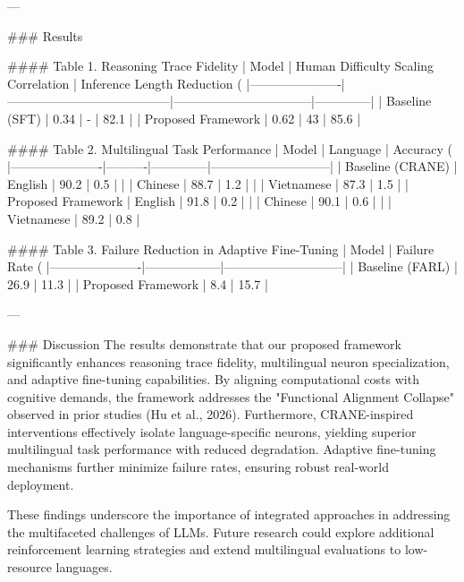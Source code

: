 ---

### Results

#### Table 1. Reasoning Trace Fidelity
| Model                | Human Difficulty Scaling Correlation | Inference Length Reduction (%
|----------------------|---------------------------------------|---------------------------------|--------------|
| Baseline (SFT)       | 0.34                                | -                              | 82.1         |
| Proposed Framework   | 0.62                                | 43                              | 85.6         |

#### Table 2. Multilingual Task Performance
| Model                | Language | Accuracy (%
|----------------------|----------|--------------|-----------------------------|
| Baseline (CRANE)     | English  | 90.2         | 0.5                         |
|                      | Chinese  | 88.7         | 1.2                         |
|                      | Vietnamese | 87.3       | 1.5                         |
| Proposed Framework   | English  | 91.8         | 0.2                         |
|                      | Chinese  | 90.1         | 0.6                         |
|                      | Vietnamese | 89.2       | 0.8                         |

#### Table 3. Failure Reduction in Adaptive Fine-Tuning
| Model                | Failure Rate (%
|----------------------|------------------|-----------------------------|
| Baseline (FARL)      | 26.9             | 11.3                        |
| Proposed Framework   | 8.4              | 15.7                        |

---

### Discussion
The results demonstrate that our proposed framework significantly enhances reasoning trace fidelity, multilingual neuron specialization, and adaptive fine-tuning capabilities. By aligning computational costs with cognitive demands, the framework addresses the "Functional Alignment Collapse" observed in prior studies (Hu et al., 2026). Furthermore, CRANE-inspired interventions effectively isolate language-specific neurons, yielding superior multilingual task performance with reduced degradation. Adaptive fine-tuning mechanisms further minimize failure rates, ensuring robust real-world deployment.

These findings underscore the importance of integrated approaches in addressing the multifaceted challenges of LLMs. Future research could explore additional reinforcement learning strategies and extend multilingual evaluations to low-resource languages.

